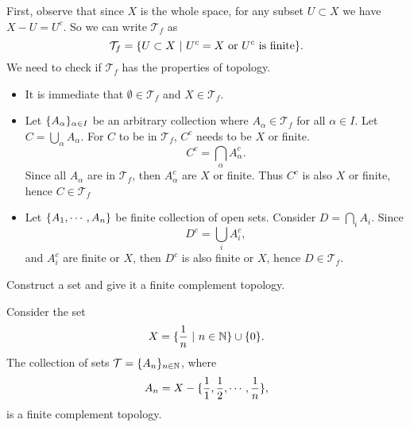 \begin{solution}
	First, observe that since $ X $ is the whole space, for any subset $ U \subset X $ we have $ X - U = U^c$. So we can write $ \mathcal{T}_f $ as 
	\[ \mathcal{T}_f = \{U \subset X\ |\ U^c = X \ \text{or}\ U^c\ \text{is finite}\}. \]
	We need to check if $ \mathcal{T}_f $ has the properties of topology. 
	\begin{itemize}
		\item It is immediate that $ \emptyset \in \mathcal{T}_f $ and $ X \in \mathcal{T}_f $.
		\item Let $ \{A_\alpha\}_{\alpha \in I} $ be an arbitrary collection where $ A_\alpha \in \mathcal{T}_f$ for all $ \alpha \in I $. Let $ C  = \bigcup_\alpha A_\alpha $. For $ C $ to be in $ \mathcal{T}_f $, $ C^c $ needs to be $ X $ or finite.
		\[ C^c = \bigcap_\alpha A^c_\alpha. \]
		Since all $ A_\alpha $ are in $ \mathcal{T}_f $, then $ A^c_\alpha $ are $ X $ or finite. Thus $ C^c $ is also $ X $ or finite, hence $ C \in \mathcal{T}_f $
		\item Let $ \{A_1,\cdots,A_n\} $ be finite collection of open sets. Consider $ D = \bigcap_i A_i $. Since
		\[ D^c = \bigcup_i A_i^c, \]
		and $ A_i^c $ are finite or $ X $, then $ D^c $ is also finite or $ X $, hence $ D \in \mathcal{T}_f $.
	\end{itemize}
\end{solution}

\begin{problem}
	Construct a set and give it a finite complement topology.
\end{problem}
\begin{solution}
	Consider the set
	\[ X = \set{\frac{1}{n}\ |\ n \in \N} \cup \set{0}. \]
	The collection of sets $ \mathcal{T} = \{A_n\}_{n \in \mathbb{N}} $, where
	\[ A_n = X - \{\frac{1}{1},\frac{1}{2},\cdots,\frac{1}{n}\}, \]
	is a finite complement topology.
\end{solution}